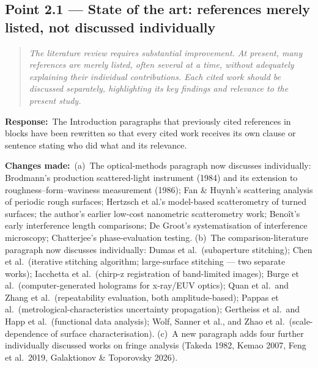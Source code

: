 \documentclass[11pt,a4paper]{article}
\newenvironment{reviewercomment}%
{\par\medskip\noindent\begin{quotation}\itshape\color{black!70}}%
{\end{quotation}\medskip}
\newcommand{\response}{\par\noindent\textbf{Response:}\ }
\newcommand{\changes}{\par\noindent\textbf{Changes made:}\ }
\begin{document}
\subsection*{Point 2.1 --- State of the art: references merely listed, not discussed individually}
\begin{reviewercomment}
The literature review requires substantial improvement. At present, many references are merely listed, often several at a time, without adequately explaining their individual contributions. Each cited work should be discussed separately, highlighting its key findings and relevance to the present study.
\end{reviewercomment}
\response The Introduction paragraphs that previously cited references in blocks have been rewritten so that every cited work receives its own clause or sentence stating who did what and its relevance.
\changes (a)~The optical-methods paragraph now discusses individually: Brodmann's production scattered-light instrument (1984) and its extension to roughness--form--waviness measurement (1986); Fan \& Huynh's scattering analysis of periodic rough surfaces; Hertzsch et al.'s model-based scatterometry of turned surfaces; the author's earlier low-cost nanometric scatterometry work; Beno\^{i}t's early interference length comparisons; De Groot's systematisation of interference microscopy; Chatterjee's phase-evaluation testing. (b)~The comparison-literature paragraph now discusses individually: Dumas et al.\ (subaperture stitching); Chen et al.\ (iterative stitching algorithm; large-surface stitching --- two separate works); Iacchetta et al.\ (chirp-z registration of band-limited images); Burge et al.\ (computer-generated holograms for x-ray/EUV optics); Quan et al.\ and Zhang et al.\ (repeatability evaluation, both amplitude-based); Pappas et al.\ (metrological-characteristics uncertainty propagation); Gertheiss et al.\ and Happ et al.\ (functional data analysis); Wolf, Sanner et al., and Zhao et al.\ (scale-dependence of surface characterisation). (c)~A new paragraph adds four further individually discussed works on fringe analysis (Takeda 1982, Kemao 2007, Feng et al.\ 2019, Galaktionov \& Toporovsky 2026).
\end{document}
